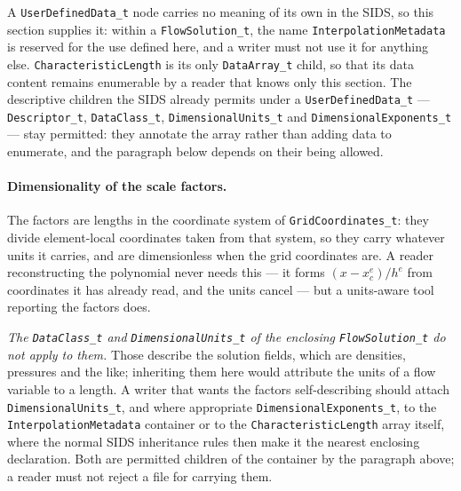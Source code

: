 \documentclass[11pt,letterpaper]{article}
\newif\ifvfourdraft
\newcommand{\vfourmark}{\ifvfourdraft\textcolor{v4violet}{\textbf{[v4]}}\ \fi}
\begin{document}
\vfourmark A \texttt{UserDefinedData\_t} node carries no meaning of its own in the
SIDS, so this section supplies it: within a \texttt{FlowSolution\_t}, the name
\texttt{InterpolationMetadata} is reserved for the use defined here, and a writer
must not use it for anything else.  \texttt{CharacteristicLength} is its only
\texttt{DataArray\_t} child, so that its data content remains enumerable by a
reader that knows only this section.  The descriptive children the SIDS already
permits under a \texttt{UserDefinedData\_t} --- \texttt{Descriptor\_t},
\texttt{DataClass\_t}, \texttt{DimensionalUnits\_t} and
\texttt{DimensionalExponents\_t} --- stay permitted: they annotate the array
rather than adding data to enumerate, and the paragraph below depends on their
being allowed.

\paragraph{\vfourmark Dimensionality of the scale factors.}
The factors are lengths in the coordinate system of \texttt{GridCoordinates\_t}:
they divide element-local coordinates taken from that system, so they carry
whatever units it carries, and are dimensionless when the grid coordinates are.
A reader reconstructing the polynomial never needs this --- it forms
$(x-x^e_c)/h^e$ from coordinates it has already read, and the units cancel --- but
a units-aware tool reporting the factors does.

\emph{The \texttt{DataClass\_t} and \texttt{DimensionalUnits\_t} of the enclosing
\texttt{FlowSolution\_t} do not apply to them.}  Those describe the solution
fields, which are densities, pressures and the like; inheriting them here would
attribute the units of a flow variable to a length.  A writer that wants the
factors self-describing should attach \texttt{DimensionalUnits\_t}, and where
appropriate \texttt{DimensionalExponents\_t}, to the
\texttt{InterpolationMetadata} container or to the \texttt{CharacteristicLength}
array itself, where the normal SIDS inheritance rules then make it the nearest
enclosing declaration.  Both are permitted children of the container by the
paragraph above; a reader must not reject a file for carrying them.
\end{document}
